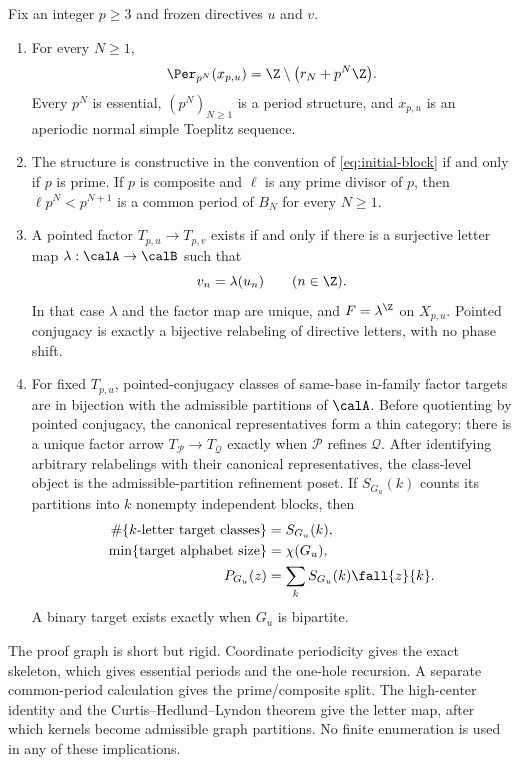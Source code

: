 \begin{theorem}
\label{thm:main}
  Fix an integer $p\geq3$ and frozen directives $u$ and $v$.
  \begin{enumerate}[label=(\alph*),leftmargin=2.2em]
    \item For every $N\geq1$,
      \begin{equation}
        \Per_{p^N}(x_{p,u})
        =\Z\setminus\bigl(r_N+p^N\Z\bigr).
        \label{eq:main-skeleton}
      \end{equation}
      Every $p^N$ is essential, $(p^N)_{N\geq1}$ is a period structure,
      and $x_{p,u}$ is an aperiodic normal simple Toeplitz sequence.
    \item The structure is constructive in the convention of
      \cref{eq:initial-block} if and only if $p$ is prime.  If $p$ is
      composite and $\ell$ is any prime divisor of $p$, then
      $\ell p^N<p^{N+1}$ is a common period of $B_N$ for every $N\geq1$.
    \item A pointed factor $T_{p,u}\to T_{p,v}$ exists if and only if
      there is a surjective letter map $\lambda:\calA\to\calB$ such that
      \begin{equation}
        v_n=\lambda(u_n)\qquad(n\in\Z).
        \label{eq:directive-quotient}
      \end{equation}
      In that case $\lambda$ and the factor map are unique, and
      $F=\lambda^{\Z}$ on $X_{p,u}$.  Pointed conjugacy is exactly a
      bijective relabeling of directive letters, with no phase shift.
    \item For fixed $T_{p,u}$, pointed-conjugacy classes of same-base
      in-family factor targets are in bijection with the admissible
      partitions of $\calA$.  Before quotienting by pointed conjugacy, the
      canonical representatives form a thin category: there is a unique
      factor arrow $T_{\mathcal P}\to T_{\mathcal Q}$ exactly when
      $\mathcal P$ refines $\mathcal Q$.  After identifying arbitrary
      relabelings with their canonical representatives, the class-level
      object is the admissible-partition refinement poset.  If
      $S_{G_u}(k)$ counts its partitions into $k$ nonempty independent
      blocks, then
      \begin{align}
        \#\{\text{$k$-letter target classes}\}&=S_{G_u}(k),
        \label{eq:main-count}\\
        \min\{\text{target alphabet size}\}&=\chi(G_u),
        \label{eq:main-chi}\\
        P_{G_u}(z)&=\sum_k S_{G_u}(k)\fall{z}{k}.
        \label{eq:main-chromatic}
      \end{align}
      A binary target exists exactly when $G_u$ is bipartite.
  \end{enumerate}
\end{theorem}

The proof graph is short but rigid.  Coordinate periodicity gives the exact
skeleton, which gives essential periods and the one-hole recursion.  A
separate common-period calculation gives the prime/composite split.  The
high-center identity and the Curtis--Hedlund--Lyndon theorem give the letter
map, after which kernels become admissible graph partitions.  No finite
enumeration is used in any of these implications.
